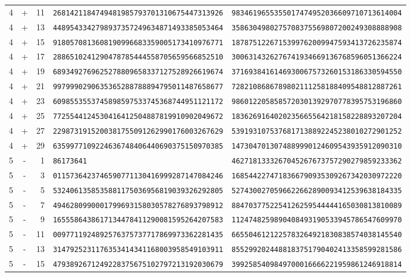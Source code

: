 \begin{longtable}{@{}rcrll@{}}
4&+&11&\texttt{2681421184749481985793701310675447313926}&\texttt{9834619655355017474952036609710713614004}\\
4&+&13&\texttt{4489543342798937357249634871493385053464}&\texttt{3586304980275708375569807200249308888908}\\
4&+&15&\texttt{9180570813608190996683359005173410976771}&\texttt{1878751226715399762009947593413726235874}\\
4&+&17&\texttt{2886510241290478785444558705659566852510}&\texttt{3006314326276741934669136768596051366224}\\
4&+&19&\texttt{6893492769625278809658337127528926619674}&\texttt{3716938416146930067573260153186330594550}\\
4&+&21&\texttt{9979990290635365288788894795011487658677}&\texttt{7282108686789802111258188409548812887261}\\
4&+&23&\texttt{6098553553745898597533745368744951121172}&\texttt{9860122058585720301392970778395753196860}\\
4&+&25&\texttt{7725544124530416412504887819910902049672}&\texttt{1836269164020235665564218158228893207204}\\
4&+&27&\texttt{2298731915200381755091262990176003267629}&\texttt{5391931075376817138892245238010272901252}\\
4&+&29&\texttt{6359977109224636748406440690375150970385}&\texttt{1473047013074889990124609543935912090310}\\
5&-&1&\texttt{86173641}&\texttt{4627181333267045267673757290279859233362}\\
5&-&3&\texttt{0115736423746590771130416999287147084246}&\texttt{1685442274718366790935309267342030972220}\\
5&-&5&\texttt{5324061358535881175036956819039326292805}&\texttt{5274300270596622662890093412539638184335}\\
5&-&7&\texttt{4946280990001799693158030578276893798912}&\texttt{8847037752254126259544444165030813810089}\\
5&-&9&\texttt{1655586438617134478411290081595264207583}&\texttt{1124748259890408493190533945786547609970}\\
5&-&11&\texttt{0097711924892576375737717869973362281435}&\texttt{6655046121225783264921830838574038145540}\\
5&-&13&\texttt{3147925231176353414341168003958549103911}&\texttt{8552992024488183751790402413358599281586}\\
5&-&15&\texttt{4793892671249228375675102797213192030679}&\texttt{3992585409849700016666221959861246918814}\\

\end{longtable}
